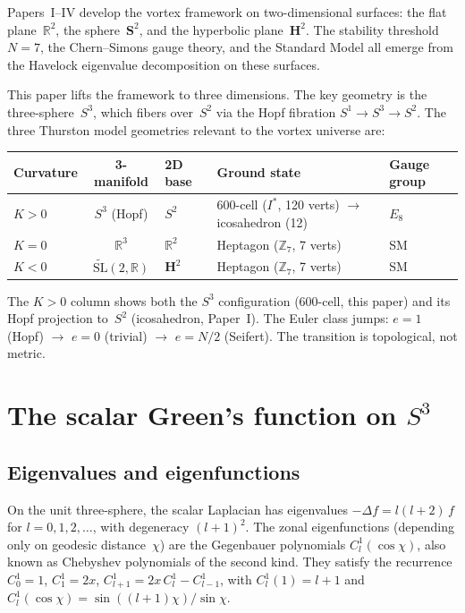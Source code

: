 Papers~I--IV develop the vortex framework on two-dimensional surfaces:
the flat plane~$\mathbb{R}^2$, the sphere~$\mathbf{S}^2$, and the
hyperbolic plane~$\mathbf{H}^2$.  The stability threshold $N = 7$,
the Chern--Simons gauge theory, and the Standard Model all emerge from
the Havelock eigenvalue decomposition on these surfaces.

This paper lifts the framework to three dimensions.  The key geometry
is the three-sphere~$S^3$, which fibers over~$S^2$ via the Hopf
fibration $S^1 \to S^3 \to S^2$.  The three Thurston model geometries
relevant to the vortex universe are:
\begin{center}
\begin{tabular}{lclll}
\toprule
Curvature & 3-manifold & 2D base & Ground state & Gauge group \\
\midrule
$K > 0$ & $S^3$ (Hopf) & $S^2$ &
  600-cell ($I^*$, 120 verts) $\to$ icosahedron (12) & $E_8$ \\
$K = 0$ & $\mathbb{R}^3$ & $\mathbb{R}^2$ &
  Heptagon ($\mathbb{Z}_7$, 7 verts) & SM \\
$K < 0$ & $\widetilde{\mathrm{SL}}(2,\mathbb{R})$ & $\mathbf{H}^2$ &
  Heptagon ($\mathbb{Z}_7$, 7 verts) & SM \\
\bottomrule
\end{tabular}
\end{center}
The $K > 0$ column shows both the $S^3$ configuration (600-cell,
this paper) and its Hopf projection to~$S^2$ (icosahedron, Paper~I).
The Euler class jumps: $e = 1$ (Hopf) $\to$ $e = 0$ (trivial) $\to$
$e = N/2$ (Seifert).  The transition is topological, not metric.

\section{The scalar Green's function on $S^3$}
\label{sec:green}

\subsection{Eigenvalues and eigenfunctions}

On the unit three-sphere, the scalar Laplacian has eigenvalues
$-\Delta f = l(l+2)\,f$ for $l = 0, 1, 2, \ldots$, with
degeneracy $(l+1)^2$.  The zonal eigenfunctions (depending only on
geodesic distance~$\chi$) are the Gegenbauer polynomials $C_l^1(\cos\chi)$,
also known as Chebyshev polynomials of the second kind.
They satisfy the recurrence $C_0^1 = 1$, $C_1^1 = 2x$,
$C_{l+1}^1 = 2x\,C_l^1 - C_{l-1}^1$,
with $C_l^1(1) = l + 1$ and $C_l^1(\cos\chi) = \sin((l{+}1)\chi)/\sin\chi$.

